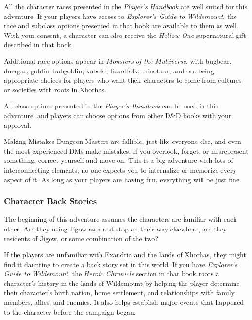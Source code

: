\documentclass[10pt,a4paper,twoside,fancy,bg=print,twocolumn,openany,nodeprecatedcode]{dndbook}
\begin{document}
All the character races presented in the \textit{Player's Handbook} are well suited for this adventure. If your players have access to \textit{Explorer's Guide to Wildemount}, the race and subclass options presented in that book are available to them as well. With your consent, a character can also receive the \textit{Hollow One} supernatural gift described in that book.

Additional race options appear in \textit{Monsters of the Multiverse}, with bugbear, duergar, goblin, hobgoblin, kobold, lizardfolk, minotaur, and orc being appropriate choices for players who want their characters to come from cultures or societies with roots in Xhorhas.

All class options presented in the \textit{Player's Handbook} can be used in this adventure, and players can choose options from other D\&D books with your approval.

\begin{DndSidebar}[float=!b]{Making Mistakes}
Dungeon Masters are fallible, just like everyone else, and even the most experienced DMs make mistakes. If you overlook, forget, or misrepresent something, correct yourself and move on. This is a big adventure with lots of interconnecting elements; no one expects you to internalize or memorize every aspect of it. As long as your players are having fun, everything will be just fine.



\end{DndSidebar}

\subsubsection{Character Back Stories}
The beginning of this adventure assumes the characters are familiar with each other. Are they using Jigow as a rest stop on their way elsewhere, are they residents of Jigow, or some combination of the two?

If the players are unfamiliar with Exandria and the lands of Xhorhas, they might find it daunting to create a back story set in this world. If you have \textit{Explorer's Guide to Wildemount}, the \textit{Heroic Chronicle} section in that book roots a character's history in the lands of Wildemount by helping the player determine their character's birth nation, home settlement, and relationships with family members, allies, and enemies. It also helps establish major events that happened to the character before the campaign began.
\end{document}
